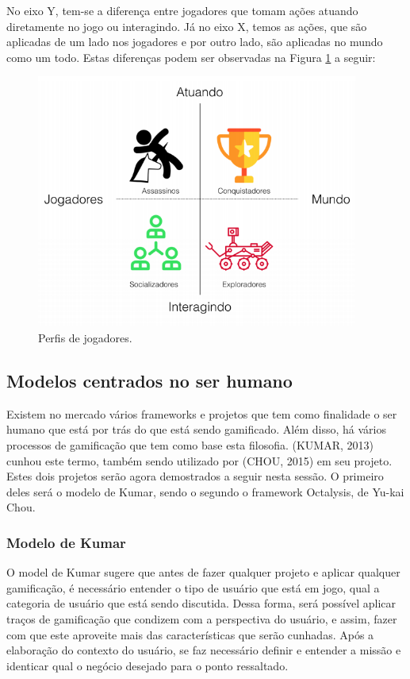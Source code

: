 No eixo Y, tem-se a diferença entre jogadores
que tomam ações atuando diretamente no jogo ou interagindo. Já no eixo X, temos as ações,
que são aplicadas de um lado nos jogadores e por outro lado, são aplicadas no mundo como
um todo. Estas diferenças podem ser observadas na Figura \ref{fig:perfiljogadores} a seguir:

\begin{figure}[h]
    \centering
    \includegraphics[width=400px, scale=1]{figuras/perfiljogadores}
    \caption{Perfis de jogadores.}
    \label{fig:perfiljogadores}
\end{figure}


\subsection{Modelos centrados no ser humano}
\label{sub:modelosnoserhumano}
Existem no mercado vários frameworks e projetos que tem como finalidade o ser
humano que está por trás do que está sendo gamificado. Além disso, há
vários processos de gamificação que tem como base esta filosofia. (KUMAR, 2013)
cunhou este termo, também sendo utilizado por (CHOU, 2015) em seu projeto.
Estes dois projetos serão agora demostrados a seguir nesta sessão. O primeiro
deles será o modelo de Kumar, sendo o segundo o framework Octalysis, de Yu-kai Chou.

\subsubsection{Modelo de Kumar}
\label{sub:modelodekumar}
O model de Kumar sugere que antes de fazer qualquer projeto e aplicar qualquer gamificação,
é necessário entender o tipo de usuário que está em jogo, qual a categoria de usuário
que está sendo discutida. Dessa forma, será possível aplicar traços de gamificação
que condizem com a perspectiva do usuário, e assim, fazer com que este aproveite
mais das características que serão cunhadas. Após a elaboração do contexto do
usuário, se faz necessário definir e entender a missão e identicar qual o negócio
desejado para o ponto ressaltado.

